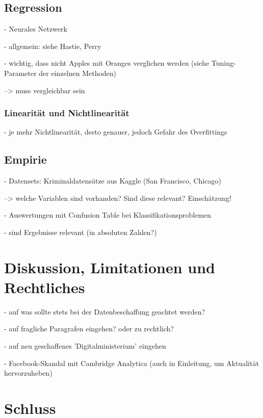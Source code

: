\documentclass[a4paper,12pt,parskip,bibtotoc,liststotoc]{article}
\begin{document}
\subsection{Regression}

- Neurales Netzwerk

- allgemein: siehe Hastie, Perry


- wichtig, dass nicht Apples mit Oranges verglichen werden (siehe Tuning-Parameter der einzelnen Methoden)

--> muss vergleichbar sein


\subsubsection{Linearität und Nichtlinearität}

- je mehr Nichtlinearität, desto genauer, jedoch Gefahr des Overfittings


\newpage
\subsection{Empirie}

- Datensets: Kriminaldatensätze aus Kaggle (San Francisco, Chicago)

--> welche Variablen sind vorhanden? Sind diese relevant? Einschätzung!

- Auswertungen mit Confusion Table bei Klassifikationsproblemen

- sind Ergebnisse relevant (in absoluten Zahlen?) 


\newpage
\section{Diskussion, Limitationen und Rechtliches}


- auf was sollte stets bei der Datenbeschaffung geachtet werden?

- auf fragliche Paragrafen eingehen? oder zu rechtlich?

- auf neu geschaffenes 'Digitalministerium' eingehen

- Facebook-Skandal mit Cambridge Analytica (auch in Einleitung, um Aktualität hervorzuheben)





\newpage
\section{Schluss}
\end{document}
